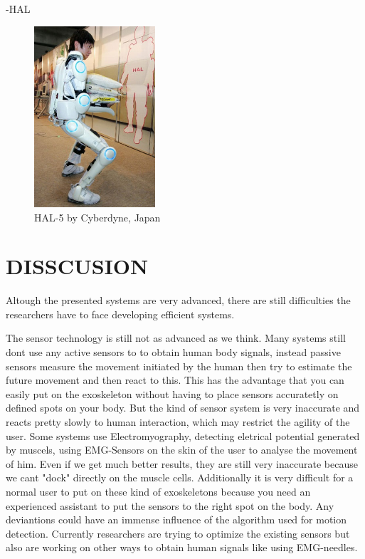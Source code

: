 \documentclass[letterpaper, 10 pt, conference]{ieeeconf}  %
\begin{document}

-HAL


\begin{figure}[H]
  \centering
    \includegraphics[width=0.4\textwidth]{img/hal}
  \caption{HAL-5 by Cyberdyne, Japan}
\end{figure}


\section{DISSCUSION}

Altough the presented systems are very advanced, there are still difficulties the researchers have to face developing efficient systems. 


The sensor technology is still not as advanced as we think. Many systems still dont use any active sensors to to obtain human body signals, instead passive sensors measure the movement initiated by the human then try to estimate the future movement and then react to this. This has the advantage that you can easily put on the exoskeleton without having to place sensors accuratetly on defined spots on your body. But the kind of sensor system is very inaccurate and reacts pretty slowly to human interaction, which may restrict the agility of the user. Some systems use Electromyography, detecting eletrical potential generated by muscels, using EMG-Sensors on the skin of the user to analyse the movement of him. Even if we get much better results, they are still very inaccurate because we cant "dock" directly on the muscle cells. Additionally it is very difficult for a normal user to put on these kind of exoskeletons because you need an experienced assistant to put the sensors to the right spot on the body. Any deviantions could have an immense influence of the algorithm used for motion detection. Currently researchers are trying to optimize the existing sensors but also are working on other ways to obtain human signals like using EMG-needles.
\end{document}
